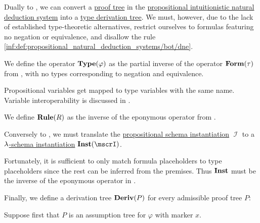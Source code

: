 \begin{algorithm}\label{alg:proof_tree_to_type_derivation}
  Dually to , we can convert a \hyperref[def:natural_deduction_proof_tree]{proof tree} in the \hyperref[def:propositional_natural_deduction_systems]{propositional intuitionistic natural deduction system} into a \hyperref[def:type_derivation_tree]{type derivation tree}. We must, however, due to the lack of established type-theoretic alternatives, restrict ourselves to formulas featuring no negation or equivalence, and disallow the rule \ref{inf:def:propositional_natural_deduction_systems/bot/dne}.

  \begin{thmenum}
     We define the operator \( \op*{Type}(\varphi) \) as the partial inverse of the operator \( \op*{Form}(\tau) \) from , with no types corresponding to negation and equivalence.

    Propositional variables get mapped to type variables with the same name. Variable interoperability is discussed in .

     We define \( \op*{Rule}(R) \) as the inverse of the eponymous operator from .

     Conversely to , we must translate the \hyperref[def:propositional_schema_instantiation]{propositional schema instantiation} \( \mscrI \) to a \hyperref[def:lambda_schema_instantiation]{\( {\mathrm \lambda} \)-schema instantiation} \( \op*{Inst}(\mscrI) \).

    Fortunately, it is sufficient to only match formula placeholders to type placeholders since the rest can be inferred from the premises. Thus \( \op*{Inst} \) must be the inverse of the eponymous operator in .

     Finally, we define a derivation tree \( \op*{Deriv}(P) \) for every admissible proof tree \( P \):
    \begin{thmenum}
       Suppose first that \( P \) is an assumption tree for \( \varphi \) with marker \( x \).


\end{thmenum}
\end{thmenum}
\end{algorithm}
